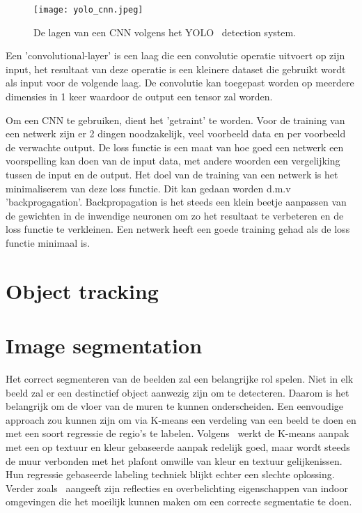             \begin{figure}[!hb]
                \centering
                \texttt{[image: yolo\_cnn.jpeg]}
                \caption{De lagen van een CNN volgens het YOLO~\cite{Redmon_2016} detection system.}
                \label{fig:yolo_cnn}
            \end{figure}

            Een 'convolutional-layer' is een laag die een convolutie operatie uitvoert op zijn input, het resultaat van deze operatie is een kleinere dataset die gebruikt wordt als input voor de volgende laag.
            De convolutie kan toegepast worden op meerdere dimensies in 1 keer waardoor de output een tensor zal worden.

            Om een CNN te gebruiken, dient het 'getraint' te worden. Voor de training van een netwerk zijn er 2 dingen noodzakelijk, veel voorbeeld data en per voorbeeld de verwachte output.
            De loss functie is een maat van hoe goed een netwerk een voorspelling kan doen van de input data, met andere woorden een vergelijking tussen de input en de output. Het doel van de training van een netwerk is het minimaliserem
            van deze loss functie. Dit kan gedaan worden d.m.v 'backprogagation'. Backpropagation is het steeds een klein beetje aanpassen van de gewichten in de inwendige neuronen om zo het resultaat te verbeteren en de loss functie te verkleinen.
            Een netwerk heeft een goede training gehad als de loss functie minimaal is.
            

    \section{Object tracking}

    \section{Image segmentation}
        Het correct segmenteren van de beelden zal een belangrijke rol spelen. Niet in elk beeld zal er een destinctief object aanwezig zijn om te detecteren. Daarom is het belangrijk om de vloer van
        de muren te kunnen onderscheiden. Een eenvoudige approach zou kunnen zijn om via K-means een verdeling van een beeld te doen en met een soort regressie de regio's te labelen. 
        Volgens~\cite{zhangwall} werkt de K-means aanpak met een op textuur en kleur gebaseerde aanpak redelijk goed, maar wordt steeds de muur verbonden met het plafont omwille van kleur en textuur gelijkenissen.
        Hun regressie gebaseerde labeling techniek blijkt echter een slechte oplossing. Verder zoals~\cite{Li2010} aangeeft zijn reflecties en overbelichting eigenschappen van indoor omgevingen die het moeilijk kunnen maken om
        een correcte segmentatie te doen.